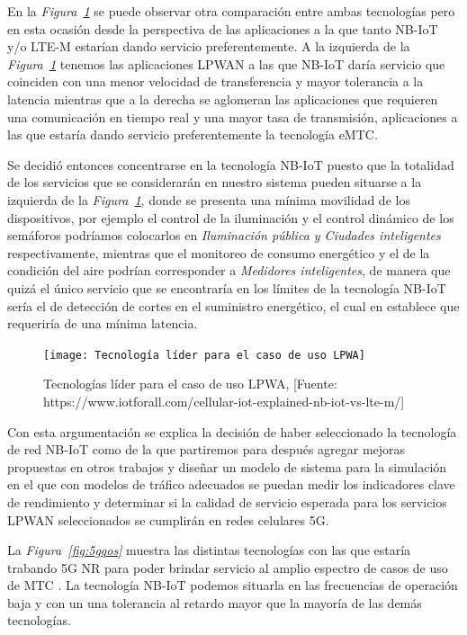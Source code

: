 En la \textit{Figura~\ref{fig:lpwa}} se puede observar otra comparación entre ambas tecnologías pero en esta ocasión desde la perspectiva de las aplicaciones a la que tanto NB-IoT y/o LTE-M estarían dando servicio preferentemente. A la izquierda de la \textit{Figura~\ref{fig:lpwa}} tenemos las aplicaciones LPWAN a las que NB-IoT daría servicio que coinciden con una menor velocidad de transferencia y mayor tolerancia a la latencia mientras que a la derecha se aglomeran las aplicaciones que requieren una comunicación en tiempo real y una mayor tasa de transmisión, aplicaciones a las que estaría dando servicio preferentemente la tecnología eMTC. \newline

Se decidió entonces concentrarse en la tecnología NB-IoT puesto que la totalidad de los servicios que se considerarán en nuestro sistema pueden situarse a la izquierda de la \textit{Figura~\ref{fig:lpwa}}, donde se presenta una mínima movilidad de los dispositivos, por ejemplo el control de la iluminación y el control dinámico de los semáforos podríamos colocarlos en \textit{Iluminación pública y Ciudades inteligentes }respectivamente, mientras que el monitoreo de consumo energético y el de la condición del aire podrían corresponder a \textit{Medidores inteligentes}, de manera que quizá el único servicio que se encontraría en los límites de la tecnología NB-IoT sería el de detección de cortes en el suministro energético, el cual en \parencite{NetTrafficIoT} establece que requeriría de una mínima latencia.\newline


\begin{figure}[th]
\centering
\texttt{[image: Tecnología líder para el caso de uso LPWA]}
\decoRule
\caption[Tecnologías líder para el caso de uso LPWA]{Tecnologías líder para el caso de uso LPWA, [Fuente: https://www.iotforall.com/cellular-iot-explained-nb-iot-vs-lte-m/]}
\label{fig:lpwa}
\end{figure}

Con esta argumentación se explica la decisión de haber seleccionado la tecnología de red NB-IoT como de la que partiremos para después agregar mejoras propuestas en otros trabajos y diseñar un modelo de sistema para la simulación en el que con modelos de tráfico adecuados se puedan medir los indicadores clave de rendimiento y determinar si la calidad de servicio esperada para los servicios LPWAN seleccionados se cumplirán en redes celulares 5G.

La \textit{Figura~\ref{fig:5gqos}} muestra las distintas tecnologías con las que estaría trabando 5G NR para poder brindar servicio al amplio espectro de casos de uso de MTC \parencite{5GAmericas}. La tecnología NB-IoT podemos situarla en las frecuencias de operación baja y con un una tolerancia al retardo mayor que la mayoría de las demás tecnologías.

